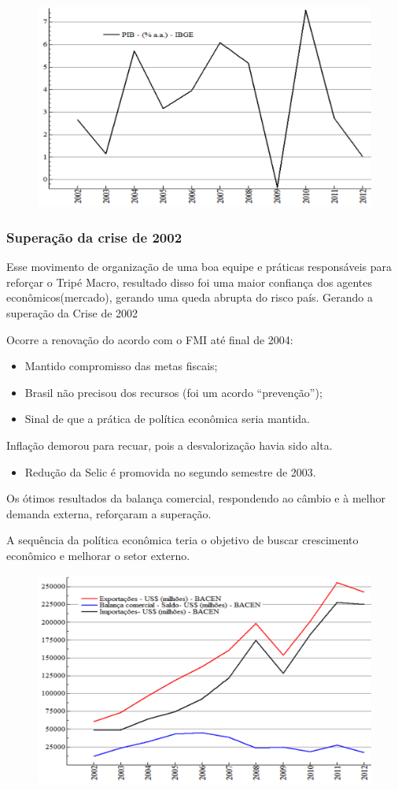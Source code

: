 \documentclass[a4paper,12pt]{article}[abntex2]
\begin{document}
\begin{figure}[H]
    \centering
    \includegraphics[width=0.7\linewidth]{Imagens/a16i5.png}
\end{figure}

\subsubsection{\textbf{Superação da crise de 2002}}
Esse movimento de organização de uma boa equipe e práticas responsáveis para reforçar o Tripé Macro, resultado disso foi uma maior confiança dos agentes econômicos(mercado), gerando uma queda abrupta do risco país. Gerando a superação da Crise de 2002

Ocorre a renovação do acordo com o FMI até final de 2004:

\begin{itemize}
    \item Mantido compromisso das metas fiscais;
    \item Brasil não precisou dos recursos (foi um acordo ``prevenção'');
    \item Sinal de que a prática de política econômica seria mantida.
\end{itemize}

Inflação demorou para recuar, pois a desvalorização havia sido alta.

\begin{itemize}
    \item Redução da Selic é promovida no segundo semestre de 2003.
\end{itemize}

Os ótimos resultados da balança comercial, respondendo ao câmbio e à melhor demanda externa, reforçaram a superação.

A sequência da política econômica teria o objetivo de buscar crescimento econômico e melhorar o setor externo.

\begin{figure}[H]
    \centering
    \includegraphics[width=0.7\linewidth]{Imagens/a16i6.png}
\end{figure}
\end{document}
